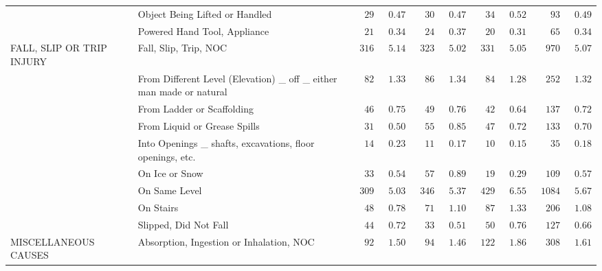\documentclass[9pt, oneside]{article}   	%
\begin{document}
\begin{longtable}{p{1.8in}p{2.2in}cccccccc}
 & Object Being Lifted or Handled  & $\phantom{00}29$ & $\phantom{0}0.47$ & $\phantom{00}30$ & $\phantom{0}0.47$ & $\phantom{00}34$ & $\phantom{0}0.52$ & $\phantom{000}93$ & $\phantom{0}0.49$ \\
 & Powered Hand Tool, Appliance  & $\phantom{00}21$ & $\phantom{0}0.34$ & $\phantom{00}24$ & $\phantom{0}0.37$ & $\phantom{00}20$ & $\phantom{0}0.31$ & $\phantom{000}65$ & $\phantom{0}0.34$ \\
FALL, SLIP OR TRIP INJURY & Fall, Slip, Trip, NOC  & $\phantom{0}316$ & $\phantom{0}5.14$ & $\phantom{0}323$ & $\phantom{0}5.02$ & $\phantom{0}331$ & $\phantom{0}5.05$ & $\phantom{00}970$ & $\phantom{0}5.07$ \\
 & From Different Level (Elevation) \_ off \_ either man made or natural  & $\phantom{00}82$ & $\phantom{0}1.33$ & $\phantom{00}86$ & $\phantom{0}1.34$ & $\phantom{00}84$ & $\phantom{0}1.28$ & $\phantom{00}252$ & $\phantom{0}1.32$ \\
 & From Ladder or Scaffolding  & $\phantom{00}46$ & $\phantom{0}0.75$ & $\phantom{00}49$ & $\phantom{0}0.76$ & $\phantom{00}42$ & $\phantom{0}0.64$ & $\phantom{00}137$ & $\phantom{0}0.72$ \\
 & From Liquid or Grease Spills  & $\phantom{00}31$ & $\phantom{0}0.50$ & $\phantom{00}55$ & $\phantom{0}0.85$ & $\phantom{00}47$ & $\phantom{0}0.72$ & $\phantom{00}133$ & $\phantom{0}0.70$ \\
 & Into Openings \_ shafts, excavations, floor openings, etc.  & $\phantom{00}14$ & $\phantom{0}0.23$ & $\phantom{00}11$ & $\phantom{0}0.17$ & $\phantom{00}10$ & $\phantom{0}0.15$ & $\phantom{000}35$ & $\phantom{0}0.18$ \\
 & On Ice or Snow  & $\phantom{00}33$ & $\phantom{0}0.54$ & $\phantom{00}57$ & $\phantom{0}0.89$ & $\phantom{00}19$ & $\phantom{0}0.29$ & $\phantom{00}109$ & $\phantom{0}0.57$ \\
 & On Same Level  & $\phantom{0}309$ & $\phantom{0}5.03$ & $\phantom{0}346$ & $\phantom{0}5.37$ & $\phantom{0}429$ & $\phantom{0}6.55$ & $\phantom{0}1084$ & $\phantom{0}5.67$ \\
 & On Stairs  & $\phantom{00}48$ & $\phantom{0}0.78$ & $\phantom{00}71$ & $\phantom{0}1.10$ & $\phantom{00}87$ & $\phantom{0}1.33$ & $\phantom{00}206$ & $\phantom{0}1.08$ \\
 & Slipped, Did Not Fall  & $\phantom{00}44$ & $\phantom{0}0.72$ & $\phantom{00}33$ & $\phantom{0}0.51$ & $\phantom{00}50$ & $\phantom{0}0.76$ & $\phantom{00}127$ & $\phantom{0}0.66$ \\
MISCELLANEOUS CAUSES & Absorption, Ingestion or Inhalation, NOC  & $\phantom{00}92$ & $\phantom{0}1.50$ & $\phantom{00}94$ & $\phantom{0}1.46$ & $\phantom{0}122$ & $\phantom{0}1.86$ & $\phantom{00}308$ & $\phantom{0}1.61$ \\

\end{longtable}
\end{document}
